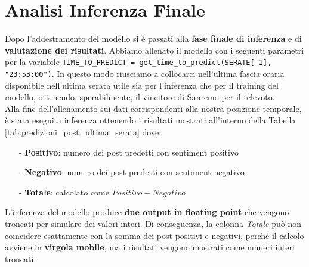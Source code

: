 \documentclass[a4paper,12pt]{article}
\begin{document}
\section{Analisi Inferenza Finale}
Dopo l'addestramento del modello si è passati alla \textbf{fase finale di inferenza} e di \textbf{valutazione dei risultati}. Abbiamo allenato il modello con i seguenti parametri per la variabile \texttt{TIME\_TO\_PREDICT = get\_time\_to\_predict(SERATE[-1], "23:53:00")}. In questo modo riusciamo a collocarci nell'ultima fascia oraria disponibile nell'ultima serata utile sia per l'inferenza che per il training del modello, ottenendo, sperabilmente, il vincitore di Sanremo per il televoto.\\
Alla fine dell'allenamento sui dati corrispondenti alla nostra posizione temporale, è stata eseguita inferenza ottenendo i risultati mostrati all'interno della Tabella \ref{tab:predizioni_post_ultima_serata} dove:
\begin{itemize}
    \item[-] \textbf{Positivo}: numero dei post predetti con sentiment positivo
    \item[-] \textbf{Negativo}: numero dei post predetti con sentiment negativo
    \item[-] \textbf{Totale}: calcolato come \(Positivo-Negativo\)
\end{itemize}

L'inferenza del modello produce \textbf{due output in floating point} che vengono troncati per simulare dei valori interi. Di conseguenza, la colonna \textit{Totale} può non coincidere esattamente con la somma dei post positivi e negativi, perché il calcolo avviene in \textbf{virgola mobile}, ma i risultati vengono mostrati come numeri interi troncati.
\end{document}

